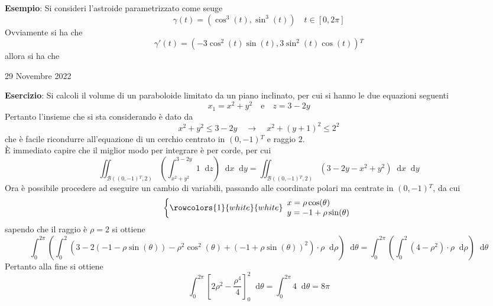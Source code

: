 \documentclass[a4paper]{extarticle}
\newcommand*\dif{\mathop{}\!\mathrm{d}}
\begin{document}
\vspace{2em}
\noindent
\textbf{Esempio}: Si consideri l'astroide parametrizzato come seuge
\[\gamma(t)=(\cos^3(t),\sin^3(t)) \hspace{1em} t \in [0,2\pi]\]
Ovviamente si ha che
\[\gamma'(t) =(-3 \cos^2(t) \sin(t), 3 \sin^2(t) \cos(t)){^T}\]
allora si ha che

\newpage
\noindent
\begin{center}
    29 Novembre 2022
\end{center}
\vspace{1em}
\noindent
\textbf{Esercizio}: Si calcoli il volume di un paraboloide limitato da un piano inclinato, per cui si hanno le due equazioni seguenti
\[x_1=x^2+y^2 \hspace{1em} \text{e} \hspace{1em} z=3-2y\]
Pertanto l'insieme che si sta considerando è dato da
\[x^2+y^2 \leq 3-2y \hspace{1em} \rightarrow \hspace{1em} x^2+(y+1)^2 \leq 2^2\]
che è facile ricondurre all'equazione di un cerchio centrato in $(0,-1){^T}$ e raggio $2$.\\
È immediato capire che il miglior modo per integrare è per corde, per cui
\[\iint_{\mathcal{B}((0,-1){^T},2)} \left(\int_{x^2+y^2}^{3-2y} 1 \dif z\right)\dif x \dif y = \iint_{\mathcal{B}((0,-1){^T},2)} (3-2y-x^2+y^2) \dif x \dif y\]
Ora è possibile procedere ad eseguire un cambio di variabili, passando alle coordinate polari ma centrate in $(0,-1){^T}$, da cui
\[
    \left\{
        \rowcolors{1}{white}{white}
        \begin{array}{l}
            x=\rho \cos(\theta)\\
            y=-1 + \rho \sin(\theta)
        \end{array}
    \right.
\]
sapendo che il raggio è $\rho=2$ si ottiene
\[\int_0^{2\pi} \left(\int_0^2 (3-2(-1-\rho \sin(\theta)) - \rho^2 \cos^2(\theta)+(-1+\rho \sin(\theta))^2)\cdot \rho \dif \rho\right) \dif \theta = \int_0^{2\pi} \left(\int_0^2 \left(4-\rho^2\right) \cdot \rho \dif \rho\right) \dif \theta\]
Pertanto alla fine si ottiene
\[\int_0^{2\pi} \left[2\rho^2 - \frac{\rho^4}{4}\right]_0^2 \dif \theta = \int_0^{2\pi} 4 \dif \theta = 8\pi\]

\vspace{1em}
\end{document}
